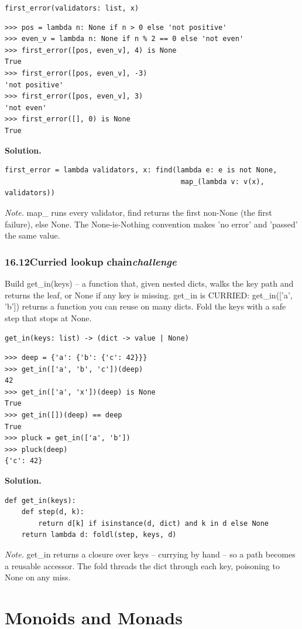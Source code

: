 \documentclass[10pt,letterpaper]{book}
\begin{document}
\noindent\texttt{first\_error(validators: list, x)}
\begin{lstlisting}[style=ex]
>>> pos = lambda n: None if n > 0 else 'not positive'
>>> even_v = lambda n: None if n % 2 == 0 else 'not even'
>>> first_error([pos, even_v], 4) is None
True
>>> first_error([pos, even_v], -3)
'not positive'
>>> first_error([pos, even_v], 3)
'not even'
>>> first_error([], 0) is None
True
\end{lstlisting}
\noindent\textbf{Solution.}
\begin{lstlisting}[style=code]
first_error = lambda validators, x: find(lambda e: e is not None,
                                          map_(lambda v: v(x), validators))
\end{lstlisting}
\noindent\textit{Note.} map\_ runs every validator, find returns the first non-None (the first failure), else None. The None-is-Nothing convention makes 'no error' and 'passed' the same value.

\subsection*{16.12\quad Curried lookup chain\hfill\textnormal{\textit{challenge}}}
Build get\_in(keys) -- a function that, given nested dicts, walks the key path and returns the leaf, or None if any key is missing. get\_in is CURRIED: get\_in(['a', 'b']) returns a function you can reuse on many dicts. Fold the keys with a safe step that stops at None.

\noindent\texttt{get\_in(keys: list) -> (dict -> value | None)}
\begin{lstlisting}[style=ex]
>>> deep = {'a': {'b': {'c': 42}}}
>>> get_in(['a', 'b', 'c'])(deep)
42
>>> get_in(['a', 'x'])(deep) is None
True
>>> get_in([])(deep) == deep
True
>>> pluck = get_in(['a', 'b'])
>>> pluck(deep)
{'c': 42}
\end{lstlisting}
\noindent\textbf{Solution.}
\begin{lstlisting}[style=code]
def get_in(keys):
    def step(d, k):
        return d[k] if isinstance(d, dict) and k in d else None
    return lambda d: foldl(step, keys, d)
\end{lstlisting}
\noindent\textit{Note.} get\_in returns a closure over keys -- currying by hand -- so a path becomes a reusable accessor. The fold threads the dict through each key, poisoning to None on any miss.

\clearpage
\chapter{Monoids and Monads}
\end{document}
